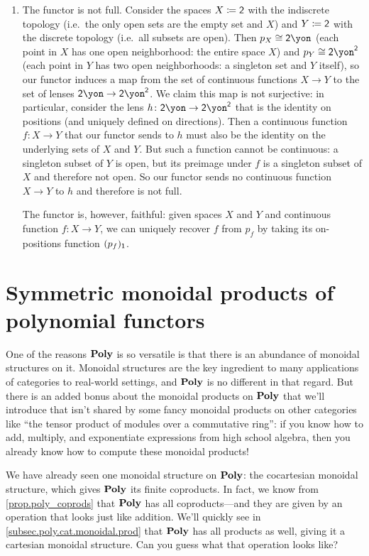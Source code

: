 \documentclass[Book-Poly]{subfiles}
\begin{document}
\begin{exercise}
\begin{solution}
\begin{enumerate}
	\item The functor is not full.
	Consider the spaces $X\coloneqq\textsf{2}$ with the indiscrete topology (i.e.\ the only open sets are the empty set and $X$) and $Y\coloneqq\textsf{2}$ with the discrete topology (i.e.\ all subsets are open).
	Then $p_X\iso\2\yon$ (each point in $X$ has one open neighborhood: the entire space $X$) and $p_Y\iso\2\yon^\2$ (each point in $Y$ has two open neighborhoods: a singleton set and $Y$ itself), so our functor induces a map from the set of continuous functions $X\to Y$ to the set of lenses $\2\yon\to\2\yon^\2$.
	We claim this map is not surjective: in particular, consider the lens $h\colon\2\yon\to\2\yon^\2$ that is the identity on positions (and uniquely defined on directions).
	Then a continuous function $f\colon X\to Y$ that our functor sends to $h$ must also be the identity on the underlying sets of $X$ and $Y$.
	But such a function cannot be continuous: a singleton subset of $Y$ is open, but its preimage under $f$ is a singleton subset of $X$ and therefore not open.
	So our functor sends no continuous function $X\to Y$ to $h$ and therefore is not full.

	The functor is, however, faithful: given spaces $X$ and $Y$ and continuous function $f\colon X\to Y$, we can uniquely recover $f$ from $p_f$ by taking its on-positions function $(p_f)_{\textsf{1}}$.
\end{enumerate}
\end{solution}
\end{exercise}

\section{Symmetric monoidal products of polynomial functors} \label{sec.poly.cat.monoidal}

One of the reasons $\mathbf{Poly}$ is so versatile is that there is an abundance of monoidal structures on it.
Monoidal structures are the key ingredient to many applications of categories to real-world settings, and $\mathbf{Poly}$ is no different in that regard.
But there is an added bonus about the monoidal products on $\mathbf{Poly}$ that we'll introduce that isn't shared by some fancy monoidal products on other categories like ``the tensor product of modules over a commutative ring'': if you know how to add, multiply, and exponentiate expressions from high school algebra, then you already know how to compute these monoidal products!

We have already seen one monoidal structure on $\mathbf{Poly}$: the cocartesian monoidal structure, which gives $\mathbf{Poly}$ its finite coproducts.
In fact, we know from \cref{prop.poly_coprods} that $\mathbf{Poly}$ has all coproducts---and they are given by an operation that looks just like addition.
We'll quickly see in \cref{subsec.poly.cat.monoidal.prod} that $\mathbf{Poly}$ has all products as well, giving it a cartesian monoidal structure.
Can you guess what that operation looks like?
\end{document}
